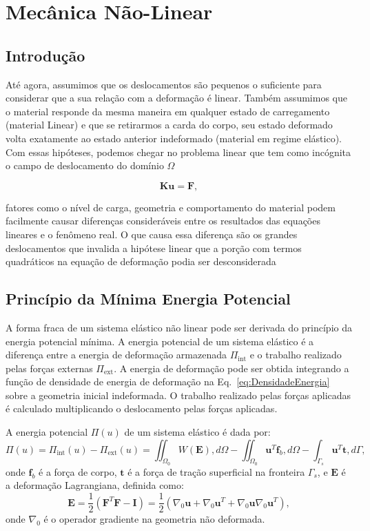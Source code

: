 \chapter{Mecânica Não-Linear}\label{ch:MecNlgeo}
\section{Introdução}
Até agora, assumimos que os deslocamentos são pequenos o suficiente para considerar que a sua relação com a deformação é linear. Também assumimos que o material responde da mesma maneira em qualquer estado de carregamento (material Linear) e que se retirarmos a carda do corpo, seu estado deformado volta exatamente ao estado anterior indeformado (material em regime elástico). Com essas hipóteses, podemos chegar no problema linear que tem como incógnita o campo de deslocamento do domínio $\Omega$

\begin{equation}
	\mathbf{K} \mathbf{u} = \mathbf{F},
\end{equation}

fatores como o nível de carga, geometria e comportamento do material podem facilmente causar diferenças consideráveis entre os resultados das equações lineares e o fenômeno real. O que causa essa diferença são os grandes deslocamentos que invalida a hipótese linear que a porção com termos quadráticos na equação de deformação podia ser desconsiderada

\section{Princípio da Mínima Energia Potencial}
A forma fraca de um sistema elástico não linear pode ser derivada do princípio da energia potencial mínima. A energia potencial de um sistema elástico é a diferença entre a energia de deformação armazenada $\Pi_{\text{int}}$ e o trabalho realizado pelas forças externas $\Pi_{\text{ext}}$. A energia de deformação pode ser obtida integrando a função de densidade de energia de deformação na Eq.~\eqref{eq:DensidadeEnergia} sobre a geometria inicial indeformada. O trabalho realizado pelas forças aplicadas é calculado multiplicando o deslocamento pelas forças aplicadas.

A energia potencial $\Pi(u)$ de um sistema elástico é dada por:
\begin{equation}\label{eq:PMEP}
	\Pi(u) = \Pi_{\text{int}}(u) - \Pi_{\text{ext}}(u) = \iint_{\Omega_0} W(\mathbf{E}) , d\Omega - \iint_{\Omega_0} \mathbf{u}^T \mathbf{f}_b , d\Omega - \int_{\Gamma_s} \mathbf{u}^T \mathbf{t} , d\Gamma,
\end{equation}
onde $\mathbf{f}_b$ é a força de corpo, $\mathbf{t}$ é a força de tração superficial na fronteira $\Gamma_s$, e $\mathbf{E}$ é a deformação Lagrangiana, definida como:
\begin{equation}
	\mathbf{E} = \frac{1}{2}\left(\mathbf{F}^T\mathbf{F}-\mathbf{I}\right)=\frac{1}{2} \left( \nabla_0 \mathbf{u} + \nabla_0 \mathbf{u}^T + \nabla_0 \mathbf{u} \nabla_0 \mathbf{u}^T \right),
\end{equation}
onde $\nabla_0$ é o operador gradiente na geometria não deformada.

